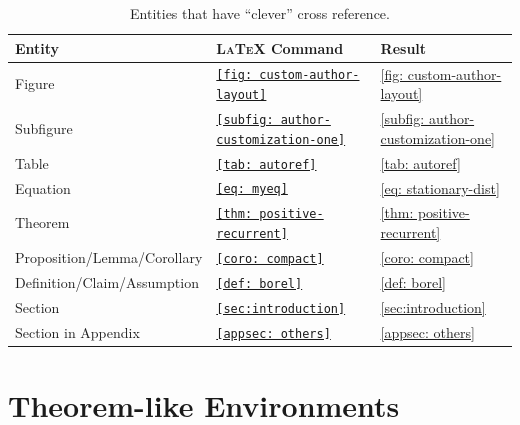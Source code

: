 \documentclass[11pt]{arxiv}
\begin{document}
    \begin{table}[!htbp]
    \begin{center}\caption{Entities that have ``clever'' cross reference.}\label{tab: autoref}
    \begin{tabular}{@{}lll@{}}
    \toprule
    Entity & \textsc{LaTeX} Command & Result \\ \midrule
    Figure & \texttt{\autoref{fig: custom-author-layout}} & \autoref{fig: custom-author-layout}\\ 
    Subfigure & \texttt{\autoref{subfig: author-customization-one}} & \autoref{subfig: author-customization-one}\\
    Table & \texttt{\autoref{tab: autoref}} & \autoref{tab: autoref}\\
    Equation & \texttt{\autoref{eq: myeq}} & \autoref{eq: stationary-dist}\\
    Theorem & \texttt{\autoref{thm: positive-recurrent}} & \autoref{thm: positive-recurrent}\\
    Proposition/Lemma/Corollary & \texttt{\autoref{coro: compact}} & \autoref{coro: compact}\\
    Definition/Claim/Assumption & \texttt{\autoref{def: borel}} & \autoref{def: borel}\\
    Section & \texttt{\autoref{sec:introduction}} & \autoref{sec:introduction}\\
    Section in Appendix & \texttt{\autoref{appsec: others}} & \autoref{appsec: others}\\
    \bottomrule
    \end{tabular}
    \end{center}
    \end{table}

\section{Theorem-like Environments}\label{sec: theorem-environment}
\end{document}
